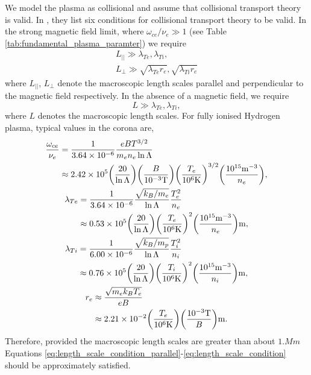 We model the plasma as collisional and assume that collisional transport theory is valid. In \citet{Richardson2019}, they list six conditions for collisional transport theory to be valid. In the strong magnetic field limit, where $\omega_{ce}/\nu_e \gg 1$ (see Table \ref{tab:fundamental_plasma_paramter}) we require
\begin{gather}
    \label{eq:length_scale_condition_parallel}
    L_{||} \gg \lambda_{Te}, \lambda_{Ti}, \\
    \label{eq:length_scale_condition_perpendicular}
    L_\perp \gg \sqrt{\lambda_{Te} r_e}, \sqrt{\lambda_{Ti} r_e}
\end{gather}
where $L_{||}$, $L_\perp$ denote the macroscopic length scales parallel and perpendicular to the magnetic field respectively. In the absence of a magnetic field, we require
\begin{equation}
    \label{eq:length_scale_condition}
    L \gg \lambda_{Te}, \lambda_{Ti},
\end{equation}
where $L$ denotes the macroscopic length scales. For fully ionised Hydrogen plasma, typical values in the corona are,
\begin{gather}
    \begin{aligned}
    \frac{\omega_{ce}}{\nu_e} &= \frac{1}{3.64\times10^{-6}}\frac{eBT^{3/2}}{m_en_e\ln\Lambda} \\
    &\approx 2.42\times10^5\qty(\frac{20}{\ln\Lambda})\qty(\frac{B}{10^{-3}\si{.T}})\qty(\frac{T_e}{10^6\si{.K}})^{3/2}\qty(\frac{10^{15}\si{.m^{-3}}}{n_e}),
    \end{aligned} \\
    \begin{aligned}
    \lambda_{Te} &= \frac{1}{3.64\times10^{-6}}\frac{\sqrt{k_B/m_e}}{\ln\Lambda}\frac{T_e^2}{n_e} \\
    &\approx 0.53\times10^5\qty(\frac{20}{\ln\Lambda})\qty(\frac{T_e}{10^6\si{.K}})^2\qty(\frac{10^{15}\si{.m^{-3}}}{n_e})\si{.m}, 
    \end{aligned} \\
    \begin{aligned}
    \lambda_{Ti} &= \frac{1}{6.00\times10^{-6}}\frac{\sqrt{k_B/m_p}}{\ln\Lambda}\frac{T_i^2}{n_i} \\
    &\approx 0.76\times10^5\qty(\frac{20}{\ln\Lambda})\qty(\frac{T_i}{10^6\si{.K}})^2\qty(\frac{10^{15}\si{.m^{-3}}}{n_i})\si{.m}, 
    \end{aligned} \\
    \begin{aligned}
    r_e & \approx \frac{\sqrt{m_e k_B T_e}}{eB} \\
    &\approx 2.21 \times 10^{-2}\qty(\frac{T_e}{10^6\si{.K}})\qty(\frac{10^{-3}\si{.T}}{B})\si{.m}.
    \end{aligned}
\end{gather}
Therefore, provided the macroscopic length scales are greater than about $1\si{.Mm}$ Equations \eqref{eq:length_scale_condition_parallel}-\eqref{eq:length_scale_condition} should be approximately satisfied.

